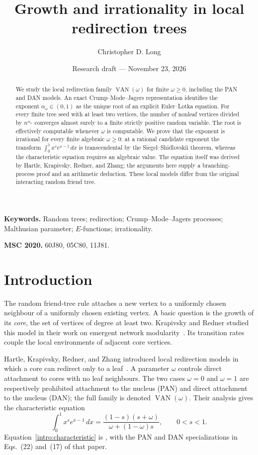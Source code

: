 \documentclass[11pt]{article}
\title{Growth and irrationality in local redirection trees}
\author{Christopher D. Long}
\date{Research draft --- November 23, 2026}
\theoremstyle{definition}
\theoremstyle{remark}
\numberwithin{equation}{section}
\begin{document}
\maketitle
\begin{abstract}
We study the local redirection family $\operatorname{VAN}(\omega)$ for
finite $\omega\ge0$, including the PAN and DAN models. An exact
Crump--Mode--Jagers representation identifies the exponent
$\alpha_\omega\in(0,1)$ as the unique root of an explicit Euler--Lotka
equation. For every finite tree seed with at least two vertices, the
number of nonleaf vertices divided by $n^{\alpha_\omega}$ converges
almost surely to a finite strictly positive random variable. The root
is effectively computable whenever $\omega$ is computable. We prove
that the exponent is irrational for every finite algebraic
$\omega\ge0$: at a rational candidate exponent the transform
$\int_0^1 x^s e^{x-1}\,dx$ is transcendental by the
Siegel--Shidlovskii theorem, whereas the characteristic equation
requires an algebraic value. The equation itself was derived by
Hartle, Krapivsky, Redner, and Zhang; the arguments here supply a
branching-process proof and an arithmetic deduction. These local
models differ from the original interacting random friend tree.
\end{abstract}

\noindent\textbf{Keywords.} Random trees; redirection; Crump--Mode--Jagers
processes; Malthusian parameter; $E$-functions; irrationality.

\medskip
\noindent\textbf{MSC 2020.} 60J80, 05C80, 11J81.

\section{Introduction}
\label{intro:section}

The random friend-tree rule attaches a new vertex to a uniformly chosen
neighbour of a uniformly chosen existing vertex. A basic question is
the growth of its \emph{core}, the set of vertices of degree at least
two. Krapivsky and Redner studied this model in their work on emergent
network modularity~\cite{KR2017}. Its transition rates couple the local
environments of adjacent core vertices.

Hartle, Krapivsky, Redner, and Zhang introduced local redirection models
in which a core can redirect only to a leaf~\cite{HRKZ2026}. A parameter
$\omega$ controls direct attachment to cores with no leaf neighbours.
The two cases $\omega=0$ and $\omega=1$ are respectively prohibited
attachment to the nucleus (PAN) and direct attachment to the nucleus
(DAN); the full family is denoted $\operatorname{VAN}(\omega)$. Their
analysis gives the characteristic equation
\begin{equation}\label{intro:characteristic}
 \int_0^1 x^s e^{x-1}\,dx
 =\frac{(1-s)(s+\omega)}{\omega+(1-\omega)s},
 \qquad 0<s<1.
\end{equation}
Equation~\eqref{intro:characteristic} is
\cite[Eq.~(25)]{HRKZ2026}, with the PAN and DAN specializations in
Eqs.~(22) and~(17) of that paper.
\end{document}
